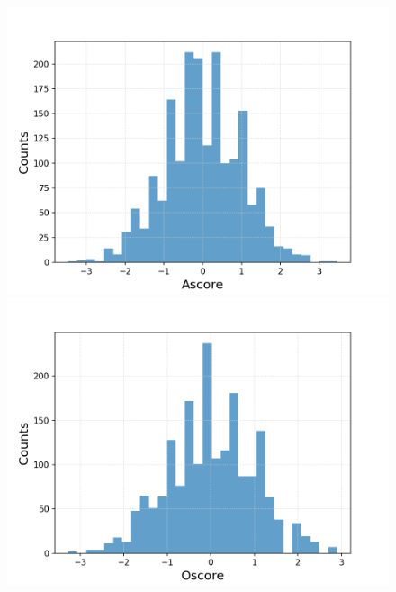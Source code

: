 \documentclass{article}
\begin{document}
\begin{figure}[h!]
	\centering
	\begin{minipage}[b]{0.32\textwidth}
		\includegraphics[width=\textwidth]{plots/drugsPlots/Ascore.png}
		
	\end{minipage}
	\begin{minipage}[b]{0.32\textwidth}
		\includegraphics[width=\textwidth]{plots/drugsPlots/Oscore.png}
		

\end{minipage}
\end{figure}
\end{document}
